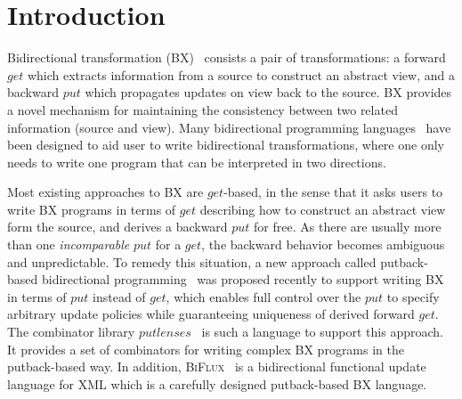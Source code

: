 \section{Introduction}
\label{sec:introduction}


Bidirectional transformation (BX)~\cite{GRACE:09} consists a pair of transformations:
a forward $get$ which extracts information from a source to construct an abstract view,
and a backward $put$ which propagates updates on view back to the source.
BX provides a novel mechanism for maintaining the consistency between two related information (source and view).
Many bidirectional programming languages~\cite{Foster-lenses,Bohannon:06,MHNHT07,Hidaka:10,PachecoCunha:10,Barbosa:2010,Hofmann:2011,FoPP08,HoPW12} have been designed
to aid user to write bidirectional transformations,
where one only needs to write one program that can be interpreted in two directions.

Most existing approaches to BX are $get$-based, in the sense that it asks users to write BX programs in terms of $get$ describing how to construct an abstract view form the source, and derives a backward $put$ for free.
As there are usually more than one {\em incomparable} $put$ for a $get$, the backward behavior becomes ambiguous and unpredictable.
%
To remedy this situation, a new approach called putback-based bidirectional programming~\cite{Fischer-essence-of-BX} was proposed recently to support writing BX in terms of $put$ instead of $get$,
which enables full control over the $put$ to specify arbitrary update policies
while guaranteeing uniqueness of derived forward $get$.
The combinator library $putlenses$~\cite{Pacheco-putlenses} is such a language to support this approach. It provides a set of combinators for writing complex BX programs in the putback-based way.
In addition, \textsc{BiFlux}~\cite{Pacheco-BiFluX} is a bidirectional functional update language for XML which is a carefully designed putback-based BX language. 

